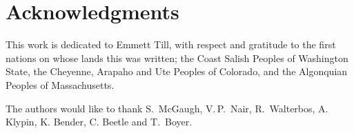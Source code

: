 \documentclass[reprint,%
 amsmath,amssymb,
 aps,
]{revtex4-1}
\begin{document}


   

  \section[]{Acknowledgments}
 This work is dedicated to Emmett Till, with respect and gratitude to the first nations 
 on whose lands this was written; 
  the Coast Salish Peoples of Washington State, 
 the Cheyenne,
 Arapaho and Ute  Peoples of Colorado, and the Algonquian Peoples of Massachusetts.  

  The authors would like to thank  S.\ McGaugh,  V.\,P.\,  Nair,   R.\, Walterbos,  A.\, Klypin, K. Bender, C. Beetle and     T.\, Boyer.   \\
  
 
\end{document}
